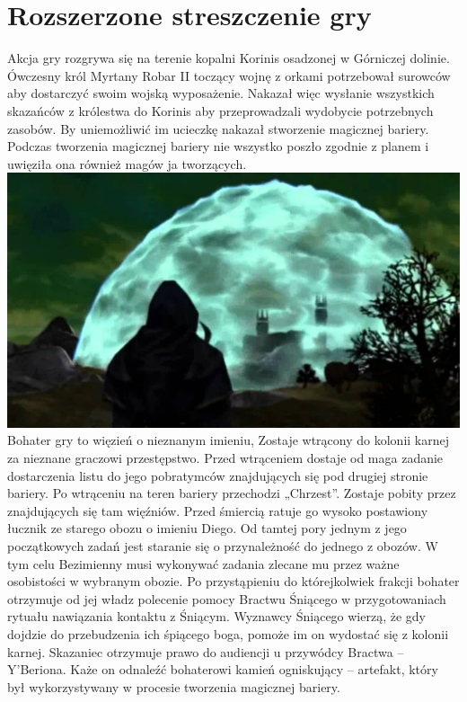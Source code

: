 \documentclass[11pt,polish, openany]{book}
\begin{document}
\chapter{Rozszerzone streszczenie gry}
Akcja gry rozgrywa się na terenie kopalni Korinis osadzonej w Górniczej dolinie.
Ówczesny król Myrtany Robar II toczący wojnę z orkami potrzebował surowców aby dostarczyć swoim wojską wyposażenie. Nakazał więc wysłanie wszystkich skazańców z królestwa do Korinis aby przeprowadzali wydobycie potrzebnych zasobów. By uniemożliwić im ucieczkę nakazał stworzenie magicznej bariery.
Podczas tworzenia magicznej bariery nie wszystko poszło zgodnie z planem i uwięziła ona również magów ja tworzących.
\newline
\includegraphics[scale=0.37]{bariera}
\newline
Bohater gry to więzień o nieznanym imieniu, Zostaje wtrącony do kolonii karnej za nieznane graczowi przestępstwo.  Przed wtrąceniem dostaje od maga zadanie dostarczenia listu do jego pobratymców znajdujących się pod drugiej stronie bariery. Po wtrąceniu na teren bariery przechodzi „Chrzest”. Zostaje pobity przez znajdujących się tam więźniów. Przed śmiercią ratuje go wysoko postawiony łucznik ze starego obozu o imieniu Diego. Od tamtej pory jednym z jego początkowych zadań jest staranie się o przynależność do jednego z obozów. W tym celu Bezimienny musi wykonywać zadania zlecane mu przez ważne osobistości w wybranym obozie.
Po przystąpieniu do którejkolwiek frakcji bohater otrzymuje od jej władz polecenie pomocy Bractwu Śniącego w przygotowaniach rytuału nawiązania kontaktu z Śniącym. Wyznawcy Śniącego wierzą, że gdy dojdzie do przebudzenia ich śpiącego boga, pomoże im on wydostać się z kolonii karnej. Skazaniec otrzymuje prawo do audiencji u przywódcy Bractwa – Y'Beriona. Każe on odnaleźć bohaterowi kamień ogniskujący – artefakt, który był wykorzystywany w procesie tworzenia magicznej bariery.
\end{document}
